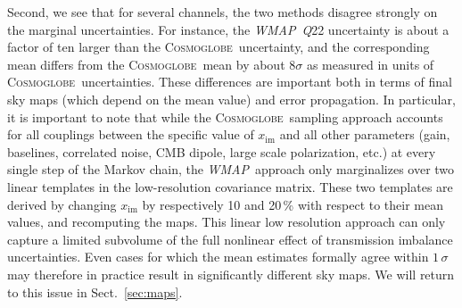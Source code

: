 \documentclass[twocolumn]{../../common/aa}
\def\WMAP{\emph{WMAP}}
\newcommand{\cosmoglobe}{\textsc{Cosmoglobe}}
\newcommand{\Q}[0]{\textit Q}
\begin{document}
Second, we see that for several channels, the two methods disagree strongly on the marginal uncertainties. For instance, the \WMAP\ \Q22 uncertainty is about a factor of ten larger than the \cosmoglobe\ uncertainty, and the corresponding mean differs from the \cosmoglobe\ mean by about $8\sigma$ as measured in units of \cosmoglobe\ uncertainties. These differences are important both in terms of final sky maps (which depend on the mean value) and error propagation. In particular, it is important to note that while the \cosmoglobe\ sampling approach accounts for all couplings between the specific value of $x_{\mathrm{im}}$ and all other parameters (gain, baselines, correlated noise, CMB dipole, large scale polarization, etc.) at every single step of the Markov chain, the \WMAP\ approach only marginalizes over two linear templates in the low-resolution covariance matrix. These two templates are derived by changing $x_{\mathrm{im}}$ by respectively 10 and 20\,\% with respect to their mean values, and recomputing the maps. This linear low resolution approach can only capture a limited subvolume of the full nonlinear effect of transmission imbalance uncertainties. Even cases for which the mean estimates formally agree within $1\,\sigma$ may therefore in practice result in significantly different sky maps. We will return to this issue in Sect.~\ref{sec:maps}. 
\end{document}
